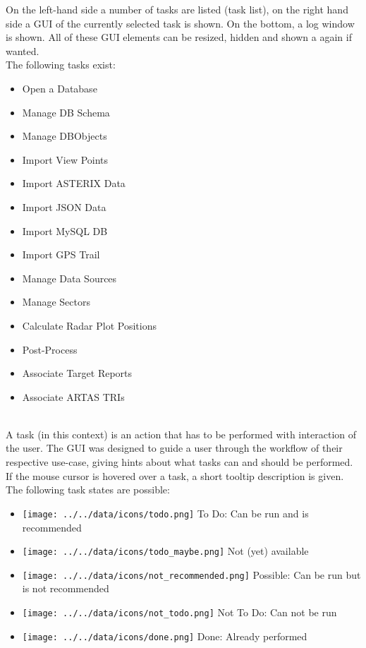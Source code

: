 On the left-hand side a number of tasks are listed (task list), on the right hand side a GUI of the currently selected task is shown. On the bottom, a log window is shown. All of these GUI elements can be resized, hidden and shown a again if wanted. \\


The following tasks exist:
\begin{itemize}
 \item Open a Database
 \item Manage DB Schema
 \item Manage DBObjects
 \item Import View Points
 \item Import ASTERIX Data
 \item Import JSON Data
 \item Import MySQL DB
 \item Import GPS Trail
 \item Manage Data Sources
 \item Manage Sectors
 \item Calculate Radar Plot Positions
 \item Post-Process
 \item Associate Target Reports
 \item Associate ARTAS TRIs
\end{itemize}
\  \\

A task (in this context) is an action that has to be performed with interaction of the user. The GUI was designed to guide a user through the workflow of their respective use-case, giving hints about what tasks can and should be performed. \\

If the mouse cursor is hovered over a task, a short tooltip description is given. \\

The following task states are possible:

\begin{itemize}
 \item \texttt{[image: ../../data/icons/todo.png]} To Do: Can be run and is recommended
 \item \texttt{[image: ../../data/icons/todo\_maybe.png]} Not (yet) available
 \item \texttt{[image: ../../data/icons/not\_recommended.png]} Possible: Can be run but is not recommended
 \item \texttt{[image: ../../data/icons/not\_todo.png]} Not To Do: Can not be run
 \item \texttt{[image: ../../data/icons/done.png]} Done: Already performed
\end{itemize}
\  \\


